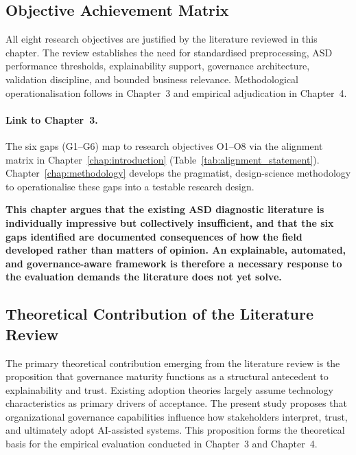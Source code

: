 \subsection{Objective Achievement Matrix}

\noindent All eight research objectives are justified by the literature reviewed in this chapter. The review establishes the need for standardised preprocessing, ASD performance thresholds, explainability support, governance architecture, validation discipline, and bounded business relevance. Methodological operationalisation follows in Chapter~3 and empirical adjudication in Chapter~4.


\paragraph{Link to Chapter~3.}
The six gaps (G1--G6) map to research objectives O1--O8 via the alignment matrix in Chapter~\ref{chap:introduction} (Table~\ref{tab:alignment_statement}). Chapter~\ref{chap:methodology} develops the pragmatist, design-science methodology to operationalise these gaps into a testable research design.

\textbf{This chapter argues that the existing ASD diagnostic literature is individually impressive but collectively insufficient, and that the six gaps identified are documented consequences of how the field developed rather than matters of opinion. An explainable, automated, and governance-aware framework is therefore a necessary response to the evaluation demands the literature does not yet solve.}


\subsection{Theoretical Contribution of the Literature Review}
\label{sec:ch2_theoretical_contribution}

\noindent The primary theoretical contribution emerging from the literature review is the proposition that governance maturity functions as a structural antecedent to explainability and trust. Existing adoption theories largely assume technology characteristics as primary drivers of acceptance. The present study proposes that organizational governance capabilities influence how stakeholders interpret, trust, and ultimately adopt AI-assisted systems. This proposition forms the theoretical basis for the empirical evaluation conducted in Chapter~3 and Chapter~4.




